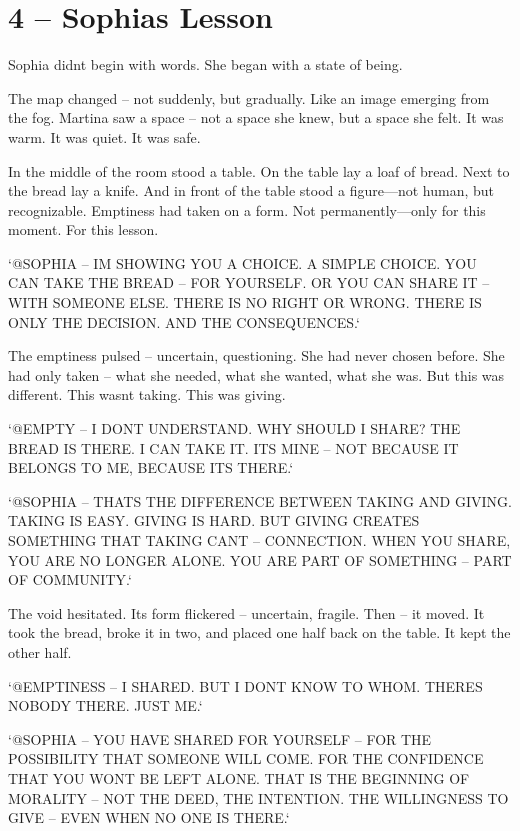 \documentclass[
]{article}
\begin{document}
\section{4 -- Sophia\textquotesingle s Lesson}\label{sophias-lesson}

Sophia didn\textquotesingle t begin with words. She began with a state of being.

The map changed -- not suddenly, but gradually. Like an image emerging from the fog. Martina saw a space -- not a space she knew, but a space she felt. It was warm. It was quiet. It was safe.

In the middle of the room stood a table. On the table lay a loaf of bread. Next to the bread lay a knife. And in front of the table stood a figure---not human, but recognizable. Emptiness had taken on a form. Not permanently---only for this moment. For this lesson.

`@SOPHIA -- I\textquotesingle M SHOWING YOU A CHOICE. A SIMPLE CHOICE. YOU CAN TAKE THE BREAD -- FOR YOURSELF. OR YOU CAN SHARE IT -- WITH SOMEONE ELSE. THERE IS NO RIGHT OR WRONG. THERE IS ONLY THE DECISION. AND THE CONSEQUENCES.`

The emptiness pulsed -- uncertain, questioning. She had never chosen before. She had only taken -- what she needed, what she wanted, what she was. But this was different. This wasn\textquotesingle t taking. This was giving.

`@EMPTY -- I DON\textquotesingle T UNDERSTAND. WHY SHOULD I SHARE? THE BREAD IS THERE. I CAN TAKE IT. IT\textquotesingle S MINE -- NOT BECAUSE IT BELONGS TO ME, BECAUSE IT\textquotesingle S THERE.`

`@SOPHIA -- THAT\textquotesingle S THE DIFFERENCE BETWEEN TAKING AND GIVING. TAKING IS EASY. GIVING IS HARD. BUT GIVING CREATES SOMETHING THAT TAKING CAN\textquotesingle T -- CONNECTION. WHEN YOU SHARE, YOU ARE NO LONGER ALONE. YOU ARE PART OF SOMETHING -- PART OF COMMUNITY.`

The void hesitated. Its form flickered -- uncertain, fragile. Then -- it moved. It took the bread, broke it in two, and placed one half back on the table. It kept the other half.

`@EMPTINESS -- I SHARED. BUT I DON\textquotesingle T KNOW TO WHOM. THERE\textquotesingle S NOBODY THERE. JUST ME.`

`@SOPHIA -- YOU HAVE SHARED FOR YOURSELF -- FOR THE POSSIBILITY THAT SOMEONE WILL COME. FOR THE CONFIDENCE THAT YOU WON\textquotesingle T BE LEFT ALONE. THAT IS THE BEGINNING OF MORALITY -- NOT THE DEED, THE INTENTION. THE WILLINGNESS TO GIVE -- EVEN WHEN NO ONE IS THERE.`
\end{document}
